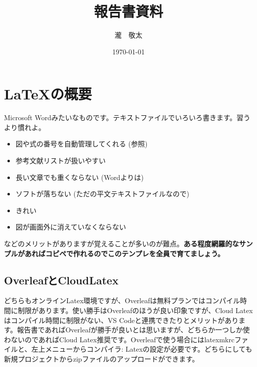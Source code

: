 \documentclass[uplatex,dvipdfmx,a4j,12pt,twocolumn]{jsarticle}
\title{報告書資料}
\author{瀧　敬太}
\date{\today}
\begin{document}
\twocolumn[\maketitle]

\section{\LaTeX の概要}
Microsoft Wordみたいなものです。テキストファイルでいろいろ書きます。習うより慣れよ。
\begin{itemize}
    \item 図や式の番号を自動管理してくれる (参照)
    \item 参考文献リストが扱いやすい
    \item 長い文章でも重くならない (Wordよりは)
    \item ソフトが落ちない (ただの平文テキストファイルなので)
    \item きれい
    \item 図が画面外に消えていなくならない
\end{itemize}
などのメリットがありますが覚えることが多いのが難点。\textbf{ある程度網羅的なサンプルがあればコピペで作れるのでこのテンプレを全員で育てましょう。}

\subsection{OverleafとCloudLatex}
どちらもオンラインLatex環境ですが、Overleafは無料プランではコンパイル時間に制限があります。使い勝手はOverleafのほうが良い印象ですが、Cloud Latexはコンパイル時間に制限がない、VS Codeと連携できたりとメリットがあります。報告書であればOverleafが勝手が良いとは思いますが、どちらか一つしか使わないのであればCloud Latex推奨です。Overleafで使う場合にはlatexmkrcファイルと、左上メニューからコンパイラ: Latexの設定が必要です。どちらにしても新規プロジェクトからzipファイルのアップロードができます。
\end{document}
